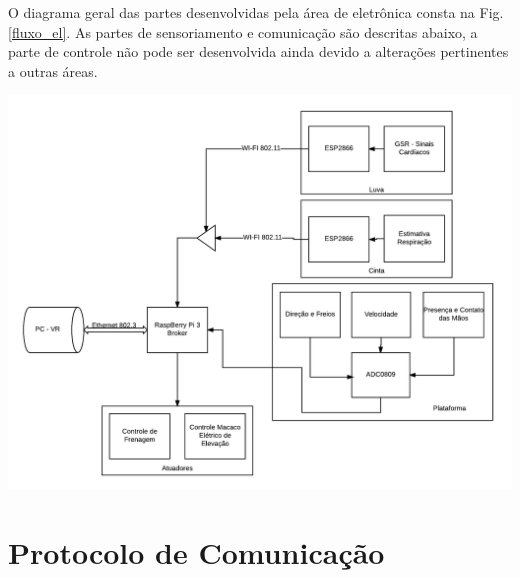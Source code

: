 	O diagrama geral das partes desenvolvidas pela área de eletrônica consta na Fig.\ref{fluxo_el}. As partes de sensoriamento e comunicação são descritas abaixo, a parte de controle não pode ser desenvolvida ainda devido a alterações pertinentes a outras áreas. 

    \begin{center}
    	\includegraphics[scale=0.4]
        {figuras/Diagrama_de_blocos_projeto.png}
        \label{fluxo_el}
    \end{center}
    
\section{Protocolo de Comunicação}
